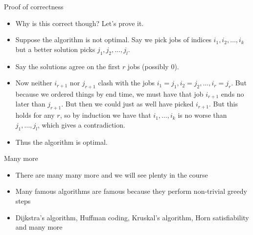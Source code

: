 \documentclass{beamer}
\begin{document}
\begin{frame}[plain]{Proof of correctness}
    \begin{itemize}
        \item Why is this correct though? Let's prove it.
        \item Suppose the algorithm is not optimal. Say we pick jobs of indices $i_1, i_2, \dots, i_k$ but a better solution picks $j_1, j_2, \dots, j_l$.
        \item Say the solutions agree on the first $r$ jobs (possibly $0$). 
        \item Now neither $i_{r+1}$ nor $j_{r+1}$ clash with the jobs $i_1 = j_1, i_2 = j_2, \dots, i_r = j_r$. But because we ordered things by end time, we must have that job $i_{r+1}$ ends no later than $j_{r+1}$. But then we could just as well have picked $i_{r+1}$. But this holds for any $r$, so by induction we have that $i_1, \dots, i_k$ is no worse than $j_1, \dots, j_l$, which gives a contradiction.
        \item Thus the algorithm is optimal.
    \end{itemize}
\end{frame}

\begin{frame}[plain]{Many more}
    \begin{itemize}
        \item There are many many more and we will see plenty in the course
        \item Many famous algorithms are famous because they perform non-trivial greedy steps
        \item Dijkstra's algorithm, Huffman coding, Kruskal's algorithm, Horn satisfiability and many more
    \end{itemize}
\end{frame}
\end{document}
